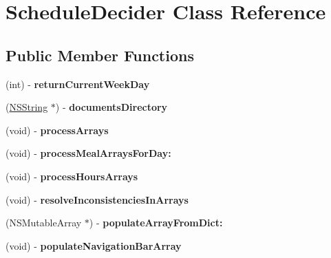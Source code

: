 \hypertarget{interface_schedule_decider}{
\section{ScheduleDecider Class Reference}
\label{interface_schedule_decider}
}
\subsection*{Public Member Functions}
\begin{DoxyCompactItemize}
\item 
\hypertarget{interface_schedule_decider_a2c4af5be95352621fe3841ec952a97f4}{
(int) -\/ {\bfseries returnCurrentWeekDay}}
\label{interface_schedule_decider_a2c4af5be95352621fe3841ec952a97f4}

\item 
\hypertarget{interface_schedule_decider_aae4ce98f34681fad24af5ac430adf30d}{
(\hyperlink{class_n_s_string}{NSString} $\ast$) -\/ {\bfseries documentsDirectory}}
\label{interface_schedule_decider_aae4ce98f34681fad24af5ac430adf30d}

\item 
\hypertarget{interface_schedule_decider_a30839d5941efe8d4d38ef635df470ae7}{
(void) -\/ {\bfseries processArrays}}
\label{interface_schedule_decider_a30839d5941efe8d4d38ef635df470ae7}

\item 
\hypertarget{interface_schedule_decider_a1781717cf12d7fcce71c9c5e9f88fca7}{
(void) -\/ {\bfseries processMealArraysForDay:}}
\label{interface_schedule_decider_a1781717cf12d7fcce71c9c5e9f88fca7}

\item 
\hypertarget{interface_schedule_decider_a525e12c2b0f2a0c26d5009fb61088dcf}{
(void) -\/ {\bfseries processHoursArrays}}
\label{interface_schedule_decider_a525e12c2b0f2a0c26d5009fb61088dcf}

\item 
\hypertarget{interface_schedule_decider_a8e4e3996491c57f375a863efcff54859}{
(void) -\/ {\bfseries resolveInconsistenciesInArrays}}
\label{interface_schedule_decider_a8e4e3996491c57f375a863efcff54859}

\item 
\hypertarget{interface_schedule_decider_ac9cd09f67b3185f10af40bb65a98bb41}{
(NSMutableArray $\ast$) -\/ {\bfseries populateArrayFromDict:}}
\label{interface_schedule_decider_ac9cd09f67b3185f10af40bb65a98bb41}

\item 
\hypertarget{interface_schedule_decider_af31c2b7a9b2a0a66a80d64d5d2ee1e19}{
(void) -\/ {\bfseries populateNavigationBarArray}}
\label{interface_schedule_decider_af31c2b7a9b2a0a66a80d64d5d2ee1e19}


\end{DoxyCompactItemize}
